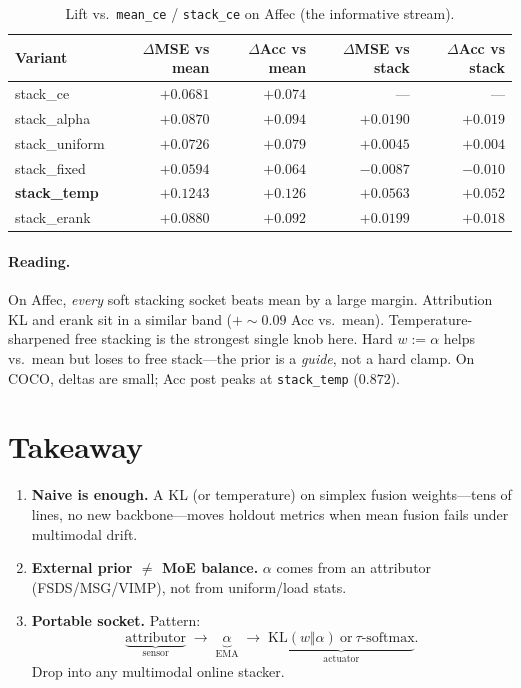 \documentclass[11pt]{article}
\begin{document}
\begin{table}[t]
\centering
\caption{Lift vs.\ \texttt{mean\_ce} / \texttt{stack\_ce} on Affec
(the informative stream).}
\label{tab:naive-sweep-lift-affec}
\begin{tabular}{lrrrr}
\toprule
Variant & $\Delta$MSE vs mean & $\Delta$Acc vs mean & $\Delta$MSE vs stack & $\Delta$Acc vs stack \\
\midrule
stack\_ce      & $+0.0681$ & $+0.074$ & ---       & --- \\
stack\_alpha   & $+0.0870$ & $+0.094$ & $+0.0190$ & $+0.019$ \\
stack\_uniform & $+0.0726$ & $+0.079$ & $+0.0045$ & $+0.004$ \\
stack\_fixed   & $+0.0594$ & $+0.064$ & $-0.0087$ & $-0.010$ \\
\textbf{stack\_temp} & $\mathbf{+0.1243}$ & $\mathbf{+0.126}$ & $\mathbf{+0.0563}$ & $\mathbf{+0.052}$ \\
stack\_erank   & $+0.0880$ & $+0.092$ & $+0.0199$ & $+0.018$ \\
\bottomrule
\end{tabular}
\end{table}

\paragraph{Reading.}
On Affec, \emph{every} soft stacking socket beats mean by a large margin.
Attribution KL and erank sit in a similar band (${+}\!\sim\!0.09$ Acc vs.\ mean).
Temperature-sharpened free stacking is the strongest single knob here.
Hard $w:=\alpha$ helps vs.\ mean but loses to free stack---the prior is a
\emph{guide}, not a hard clamp.
On COCO, deltas are small; Acc post peaks at \texttt{stack\_temp} ($0.872$).

\section{Takeaway}
\label{sec:takeaway}

\begin{enumerate}
  \item \textbf{Naive is enough.} A KL (or temperature) on simplex fusion
        weights---tens of lines, no new backbone---moves holdout metrics
        when mean fusion fails under multimodal drift.
  \item \textbf{External prior $\neq$ MoE balance.} $\alpha$ comes from an
        attributor (FSDS/MSG/VIMP), not from uniform/load stats.
  \item \textbf{Portable socket.} Pattern:
        \[
          \underbrace{\text{attributor}}_{\text{sensor}}
          \;\to\;
          \underbrace{\alpha}_{\text{EMA}}
          \;\to\;
          \underbrace{\mathrm{KL}(w\Vert\alpha)\ \text{or}\ \tau\text{-softmax}}_{\text{actuator}}.
        \]
        Drop into any multimodal online stacker.
\end{enumerate}
\end{document}
